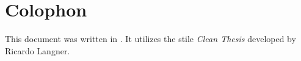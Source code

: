 %
\pagestyle{empty}
\hfill
\vfill
{}
\section*{Colophon}

This document was written in \LaTeXe. It utilizes the stile \textit{Clean Thesis} developed by Ricardo Langner.